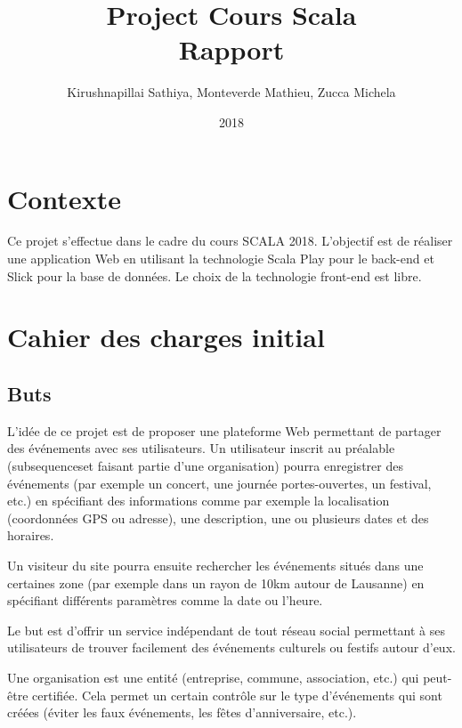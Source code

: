 \documentclass[11pt, a4paper, french, twoside]{article}
\title{Project Cours Scala \\ Rapport}
\author{Kirushnapillai Sathiya, Monteverde Mathieu, Zucca Michela}
\date{2018}
\begin{document}
	\graphicspath{ {images/} }
	
	\newcommand{\HRule}{\rule{\linewidth}{0.5mm}}
	
	
	
	\setcounter{page}{1}
	\newpage
	
	\setlength{\parskip}{0.2cm}
	
	\section{Contexte}
	\label{sec:contexte}
		Ce projet s'effectue dans le cadre du cours SCALA 2018. L'objectif est de réaliser une application Web en utilisant la technologie Scala Play pour le back-end et Slick pour la base de données. Le choix de la technologie front-end est libre.
		
	\section{Cahier des charges initial}
	\label{sec:description}
	
		\subsection{Buts}
		\label{subsec:buts}
		L'idée de ce projet est de proposer une plateforme Web permettant de partager des événements avec ses utilisateurs. Un utilisateur inscrit au préalable (subsequenceset faisant partie d'une organisation) pourra enregistrer des événements (par exemple un concert, une journée portes-ouvertes, un festival, etc.) en spécifiant des informations comme par exemple la localisation (coordonnées GPS ou adresse), une description, une ou plusieurs dates et des horaires.
		
		Un visiteur du site pourra ensuite rechercher les événements situés dans une certaines zone (par exemple dans un rayon de 10km autour de Lausanne) en spécifiant différents paramètres comme la date ou l'heure. 
		
		Le but est d'offrir un service indépendant de tout réseau social permettant à ses utilisateurs de trouver facilement des événements culturels ou festifs autour d'eux. 
		
		Une organisation est une entité (entreprise, commune, association, etc.) qui peut-être certifiée. Cela permet un certain contrôle sur le type d'événements qui sont créées (éviter les faux événements, les fêtes d'anniversaire, etc.).
	
\end{document}
